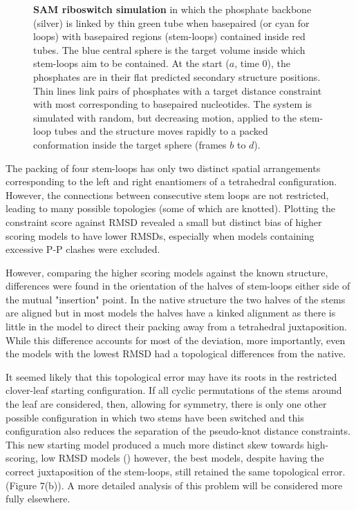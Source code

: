 \begin{figure}
\centering
{}
\caption{
\label{Fig:myo2DFS}
{\bf SAM riboswitch simulation} in which the phosphate backbone (silver) is linked by
thin green tube when basepaired (or cyan for loops) with basepaired regions (stem-loops)
contained inside red tubes.  The blue central sphere is the target volume inside which
stem-loops aim to be contained.   At the start ($a$, time 0), the phosphates are in their
flat predicted secondary structure positions.   Thin lines link pairs of phosphates with
a target distance constraint with most corresponding to basepaired nucleotides.
The system is simulated with random, but decreasing motion, applied to the stem-loop tubes
and the structure moves rapidly to a packed conformation inside the target sphere
(frames $b$ to $d$).    
}
\end{figure}

The packing of four stem-loops has only two distinct spatial arrangements corresponding to
the left and right enantiomers of a tetrahedral configuration.   However, the connections 
between consecutive stem loops are not restricted, leading to many possible topologies
(some of which are knotted).   Plotting the constraint score against RMSD revealed a
small but distinct bias of higher scoring models to have lower RMSDs, especially when
models containing excessive P-P clashes were excluded.

However, comparing the higher scoring models against the known structure, differences
were found in the orientation of the halves of stem-loops either side of the mutual
"insertion" point.  In the native structure the two halves of the stems are aligned but
in most models the halves have a kinked alignment as there is little in the model to
direct their packing away from a tetrahedral juxtaposition.   While this difference
accounts for most of the deviation, more importantly, even the models with the lowest 
RMSD had a topological differences from the native.     

It seemed likely that this topological error may have its roots in the restricted
clover-leaf starting configuration.   If all cyclic permutations of the stems around the
leaf are considered, then, allowing for symmetry, there is only one other possible
configuration in which two stems have been switched and this configuration
also reduces the separation of the pseudo-knot distance constraints.  This new starting
model produced a much more distinct skew towards high-scoring, low RMSD models
() however, the best models, despite having the correct juxtaposition
of the stem-loops, still retained the same topological error.  (Figure 7(b)).
A more detailed analysis of this problem will be considered more fully elsewhere.

